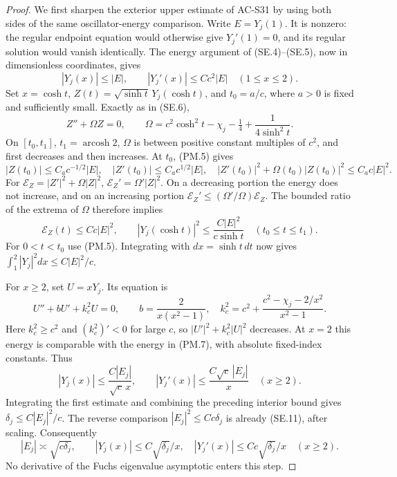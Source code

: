 \begin{proof}
We first sharpen the exterior upper estimate of AC-S31 by using both
sides of the same oscillator-energy comparison.  Write \(E=Y_j(1)\).
It is nonzero: the regular endpoint equation would otherwise give
\(Y_j'(1)=0\), and its regular solution would vanish identically.
The energy argument of (SE.4)--(SE.5), now in dimensionless coordinates,
gives
\[
 |Y_j(x)|\le |E|,\qquad |Y_j'(x)|\le Cc^2|E|
                       \quad(1\le x\le2).
 \tag{PM.5}
\]
Set \(x=\cosh t\), \(Z(t)=\sqrt{\sinh t}\,Y_j(\cosh t)\),
and \(t_0=a/c\), where \(a>0\) is fixed and sufficiently small.
Exactly as in (SE.6),
\[
 Z''+\Omega Z=0,\qquad
 \Omega=c^2\cosh^2t-\chi_j-\tfrac14+\frac1{4\sinh^2t}.
 \tag{PM.6}
\]
On \([t_0,t_1]\), \(t_1=\operatorname{arcosh}2\), \(\Omega\)
is between positive constant multiples of \(c^2\), and first
decreases and then increases.  At \(t_0\), (PM.5) gives
\[
 |Z(t_0)|\le C_a c^{-1/2}|E|,\quad
 |Z'(t_0)|\le C_a c^{1/2}|E|,\quad
 |Z'(t_0)|^2+\Omega(t_0)|Z(t_0)|^2\le C_ac|E|^2.
\]
For \(\mathcal E_Z=|Z'|^2+\Omega|Z|^2\),
\(\mathcal E_Z'=\Omega'|Z|^2\).  On a decreasing portion the
energy does not increase, and on an increasing portion
\(\mathcal E_Z'\le(\Omega'/\Omega)\mathcal E_Z\).
The bounded ratio of the extrema of \(\Omega\) therefore implies
\[
 \mathcal E_Z(t)\le Cc|E|^2,
 \qquad |Y_j(\cosh t)|^2\le\frac{C|E|^2}{c\sinh t}
                       \quad(t_0\le t\le t_1).
 \tag{PM.7}
\]
For \(0<t<t_0\) use (PM.5).  Integrating with \(dx=\sinh t\,dt\)
now gives \(\int_1^2|Y_j|^2dx\le C|E|^2/c\).

For \(x\ge2\), set \(U=xY_j\).  Its equation is
\[
 U''+bU'+k_c^2U=0,\qquad b=\frac2{x(x^2-1)},\quad
 k_c^2=c^2+\frac{c^2-\chi_j-2/x^2}{x^2-1}.
 \tag{PM.8}
\]
Here \(k_c^2\ge c^2\) and \((k_c^2)'<0\) for large \(c\),
so \(|U'|^2+k_c^2|U|^2\) decreases.  At \(x=2\) this energy
is comparable with the energy in (PM.7), with absolute fixed-index
constants.  Thus
\[
 |Y_j(x)|\le\frac{C|E_j|}{\sqrt c\,x},\qquad
 |Y_j'(x)|\le\frac{C\sqrt c\,|E_j|}{x}
                      \quad(x\ge2).
 \tag{PM.9}
\]
Integrating the first estimate and combining the preceding interior
bound gives \(\delta_j\le C|E_j|^2/c\).  The reverse comparison
\(|E_j|^2\le Cc\delta_j\) is already (SE.11), after scaling.
Consequently
\[
 |E_j|\asymp\sqrt{c\delta_j},\qquad
 |Y_j(x)|\le C\sqrt{\delta_j}/x,\quad
 |Y_j'(x)|\le Cc\sqrt{\delta_j}/x\quad(x\ge2).
 \tag{PM.10}
\]
No derivative of the Fuchs eigenvalue asymptotic enters this step.


\end{proof}
